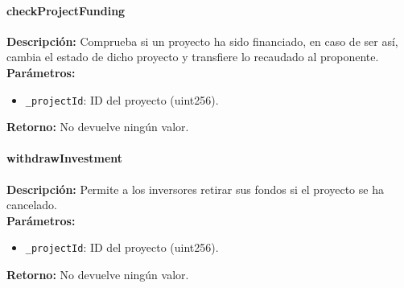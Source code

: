 \paragraph{checkProjectFunding}
\noindent
\textbf{Descripción:}
Comprueba si un proyecto ha sido financiado, en caso de ser así, cambia el estado de dicho proyecto y transfiere lo recaudado al proponente. \\
\textbf{Parámetros:}
\begin{itemize}
\item \texttt{\_projectId}: ID del proyecto (uint256).
\end{itemize}
\textbf{Retorno:}
No devuelve ningún valor.


\paragraph{withdrawInvestment}
\noindent
\textbf{Descripción:}
Permite a los inversores retirar sus fondos si el proyecto se ha cancelado. \\
\textbf{Parámetros:}
\begin{itemize}
\item \texttt{\_projectId}: ID del proyecto (uint256).
\end{itemize}
\textbf{Retorno:}
No devuelve ningún valor.

\newpage
